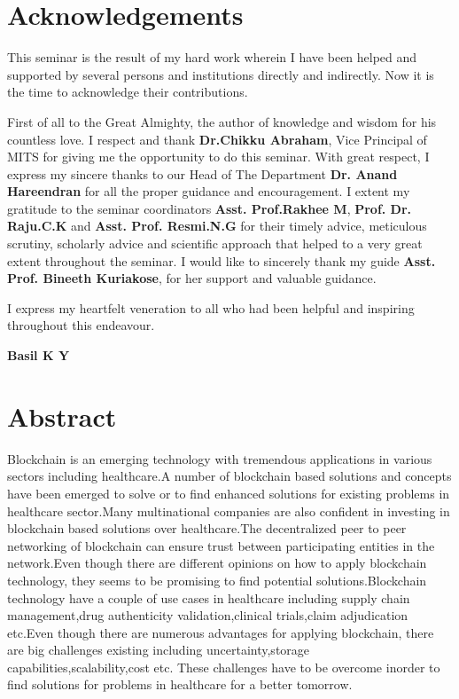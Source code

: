 \documentclass[12pt]{report}
\begin{document}
\section*{\centering Acknowledgements}
\par This seminar is the result of my hard work wherein I have been helped and supported by several persons and institutions directly and indirectly. Now it is the time to acknowledge their contributions. 

\par First of all to the Great Almighty, the author of knowledge and wisdom for his countless love. I respect and thank \textbf{Dr.Chikku Abraham}, Vice Principal of MITS for giving me the opportunity to do this seminar.
With great respect, I express my sincere thanks to our Head of The Department \textbf{Dr. Anand Hareendran} for all the proper guidance and encouragement. I extent my gratitude to the seminar coordinators \textbf{Asst. Prof.Rakhee M}, \textbf{Prof. Dr. Raju.C.K} and \textbf{Asst. Prof. Resmi.N.G} for their timely advice, meticulous scrutiny, scholarly advice and scientific approach that helped to a very great extent throughout the seminar. I would like to sincerely thank my guide \textbf{Asst. Prof. Bineeth Kuriakose}, for her support and valuable guidance.

\par I express my heartfelt veneration to all who had been helpful and inspiring throughout this endeavour.


\null\hfill \textbf{Basil K Y}
\newpage

\section*{\centering Abstract}
Blockchain is an emerging technology with tremendous applications in various sectors including healthcare.A number of blockchain based solutions and concepts have been emerged to solve or to find enhanced solutions for existing problems in healthcare sector.Many multinational companies are also confident in investing in blockchain based solutions over healthcare.The decentralized peer to peer networking of blockchain can ensure trust between participating entities in the network.Even though there are different opinions on how to apply blockchain technology, they seems to be promising to find potential solutions.Blockchain technology have a couple of use cases in healthcare including supply chain management,drug authenticity validation,clinical trials,claim adjudication etc.Even though there are numerous advantages for applying blockchain, there are big challenges existing including uncertainty,storage capabilities,scalability,cost etc. These challenges have to be overcome inorder to find solutions for problems in healthcare for a better tomorrow.
\newpage
\end{document}
